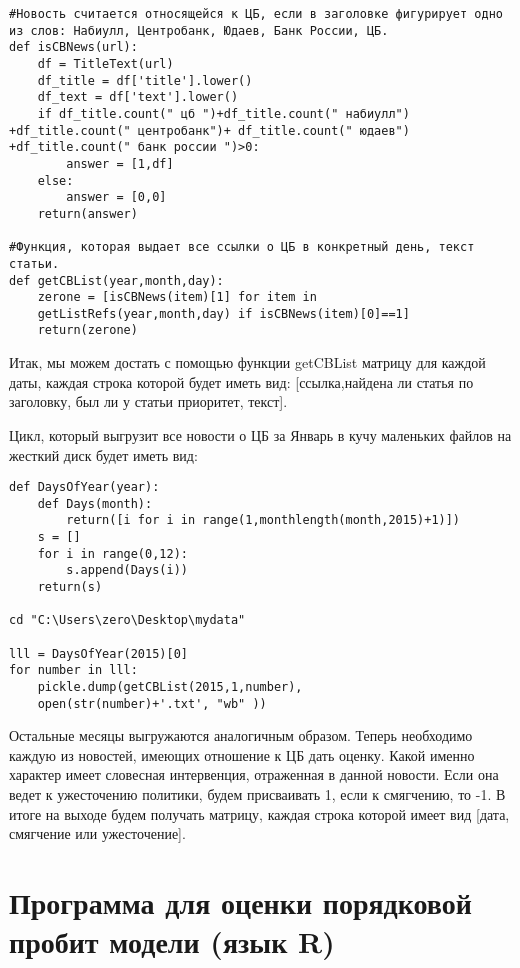 \documentclass[14pt,a4paper, oneside]{extreport}
\begin{document}
\begin{verbatim}
#Новость считается относящейся к ЦБ, если в заголовке фигурирует одно из слов: Набиулл, Центробанк, Юдаев, Банк России, ЦБ.
def isCBNews(url):
    df = TitleText(url)
    df_title = df['title'].lower()
    df_text = df['text'].lower()
    if df_title.count(" цб ")+df_title.count(" набиулл")    +df_title.count(" центробанк")+ df_title.count(" юдаев")    +df_title.count(" банк россии ")>0:
        answer = [1,df]
    else:
        answer = [0,0]
    return(answer)

#Функция, которая выдает все ссылки о ЦБ в конкретный день, текст статьи.
def getCBList(year,month,day):
    zerone = [isCBNews(item)[1] for item in 
    getListRefs(year,month,day) if isCBNews(item)[0]==1]
    return(zerone)
\end{verbatim}

Итак, мы можем достать с помощью функции getCBList матрицу для каждой даты, каждая строка которой будет иметь вид: [ссылка,найдена ли статья по заголовку, был ли у статьи приоритет, текст].

Цикл, который выгрузит все новости о ЦБ за Январь в кучу маленьких файлов на жесткий диск будет иметь вид:

\begin{verbatim}
def DaysOfYear(year):
    def Days(month):
        return([i for i in range(1,monthlength(month,2015)+1)])
    s = []
    for i in range(0,12):
        s.append(Days(i))
    return(s)
    
cd "C:\Users\zero\Desktop\mydata"

lll = DaysOfYear(2015)[0]
for number in lll:
    pickle.dump(getCBList(2015,1,number), 
    open(str(number)+'.txt', "wb" )) 
\end{verbatim}

Остальные месяцы выгружаются аналогичным образом. Теперь необходимо каждую из новостей, имеющих отношение к ЦБ дать оценку. Какой именно характер имеет словесная интервенция, отраженная в данной новости. Если она ведет к ужесточению политики, будем присваивать 1, если к смягчению, то -1. В итоге на выходе будем получать матрицу, каждая строка которой имеет вид [дата, смягчение или ужесточение].



\chapter[Программа~~  для~~  оценки~~  порядковой \\ пробит модели (язык R)]{Программа для оценки порядковой пробит модели (язык R)}\label{app-b}
\end{document}
